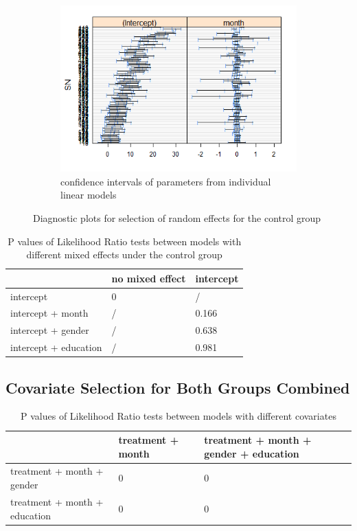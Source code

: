 \begin{figure}[H]
\begin{subfigure}{.33\textwidth}
  \centering
  \includegraphics[width=1\linewidth]{../../plots/interval_control.png}
  \caption{confidence intervals of parameters from individual linear models}
\end{subfigure}
\caption{Diagnostic plots for selection of random effects for the control group}
\label{fig:diagnostic.control}
\end{figure}

\begin{table}[H]
\centering
\begin{tabular}{|l|l|l|}
\hline
& no mixed effect & intercept \\
\hline
intercept & 0 &/ \\
\hline
intercept + month &/ & 0.166 \\
\hline
intercept + gender &/ & 0.638 \\
\hline
intercept + education &/ & 0.981 \\
\hline
\end{tabular}
\caption{P values of Likelihood Ratio tests between models with different mixed effects under the control group}
\label{tab:model.comp.control.me.lrt}
\end{table}
\subsection{Covariate Selection for Both Groups Combined}
\begin{table}[H]
\centering
\begin{tabular}{|l|l|l|}
\hline
& treatment + month & treatment + month + gender + education \\
\hline
treatment + month + gender & 0 & 0 \\
\hline
treatment + month + education & 0 & 0 \\
\hline
\end{tabular}
\caption{P values of Likelihood Ratio tests between models with different covariates}
\label{tab:model.comp.lrt}
\end{table}
